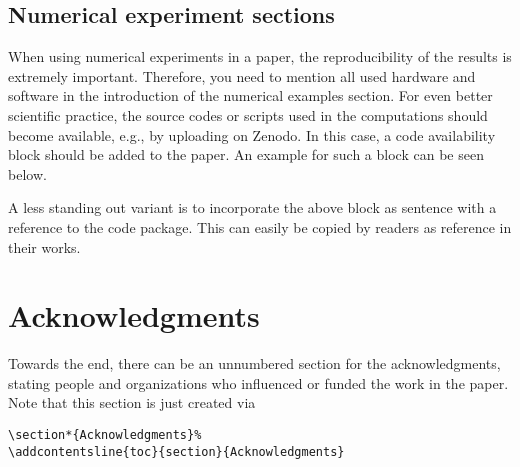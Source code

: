 \documentclass[%
  a4paper,
  twocolumn,
  colorlinks,
]{preprint}
\begin{document}

\subsection{Numerical experiment sections}%
\label{subsec:numexp}

When using numerical experiments in a paper, the reproducibility of the
results is extremely important.
Therefore, you need to mention all used hardware and software in the
introduction of the numerical examples section.
For even better scientific practice, the source codes or scripts used in the
computations should become available, e.g., by uploading on Zenodo.
In this case, a code availability block should be added to the paper.
An example for such a block can be seen below.

\begin{center}%
  \setlength{\fboxsep}{5pt}%
\end{center}

A less standing out variant is to incorporate the above block as sentence with
a reference to the code package.
This can easily be copied by readers as reference in their works.



\section*{Acknowledgments}%

Towards the end, there can be an unnumbered section for the acknowledgments,
stating people and organizations who influenced or funded the work in the paper.
Note that this section is just created via
\begin{verbatim}
\section*{Acknowledgments}%
\addcontentsline{toc}{section}{Acknowledgments}
\end{verbatim}
\end{document}
